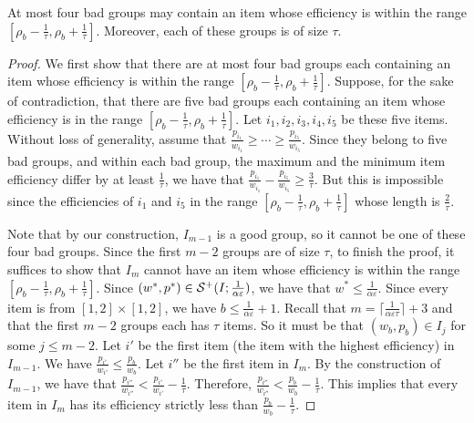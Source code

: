 \documentclass[a4paper,UKenglish,cleveref, autoref, thm-restate, pdfa]{lipics-v2021}
\newcommand{\eps}{\varepsilon}
\renewcommand{\leq}{\leqslant}
\renewcommand{\geq}{\geqslant}
\begin{document}
\begin{lemma}\label{lem:bound-median}
    At most four bad groups may contain an item whose efficiency is within the range $[\rho_b - \frac{1}{\tau}, \rho_b + \frac{1}{\tau}]$. Moreover, each of these groups is of size $\tau$.
\end{lemma}
\begin{proof}
    We first show that there are at most four bad groups each containing an item whose efficiency is within the range $[\rho_b - \frac{1}{\tau}, \rho_b + \frac{1}{\tau}]$.  Suppose, for the sake of contradiction, that there are five bad groups each containing an item whose efficiency is in the range $[\rho_b - \frac{1}{\tau}, \rho_b + \frac{1}{\tau}]$.  Let $i_1, i_2, i_3, i_4, i_5$ be these five items. Without loss of generality, assume that $\frac{p_{i_1}}{w_{i_1}} \geq \cdots \geq \frac{p_{i_5}}{w_{i_5}}$. Since they belong to five bad groups, and within each bad group, the maximum and the minimum item efficiency differ by at least $\frac{1}{\tau}$, we have that $\frac{p_{i_1}}{w_{i_1}} - \frac{p_{i_5}}{w_{i_5}} \geq \frac{3}{\tau}$. But this is impossible since the efficiencies of $i_1$ and $i_5$ in the range $[\rho_b - \frac{1}{\tau}, \rho_b + \frac{1}{\tau}]$ whose length is $\frac{2}{\tau}$.

    Note that by our construction, $I_{m-1}$ is a good group, so it cannot be one of these four bad groups. 
    Since the first $m-2$ groups are of size $\tau$, to finish the proof, it suffices to show that $I_{m}$ cannot have an item whose efficiency is within the range $[\rho_b - \frac{1}{\tau}, \rho_b + \frac{1}{\tau}]$.  Since $(w^*, p^*) \in {\cal S}^+(I; \frac{1}{\alpha\eps})$, we have that $w^* \leq \frac{1}{\alpha\eps}$. Since every item is from $[1,2]\times[1,2]$, we have $b \leq \frac{1}{\alpha\eps} + 1$. Recall that $m = \lceil\frac{1}{\alpha\eps\tau}\rceil + 3$ and that the first $m-2$ groups each has $\tau$ items. So it must be that $(w_b, p_b) \in I_j$ for some $j \leq m-2$. Let $i'$ be the first item (the item with the highest efficiency) in $I_{m-1}$. We have $ \frac{p_{i'}}{w_{i'}} \leq \frac{p_b}{w_b}$. Let $i''$ be the first item in $I_m$.  By the construction of $I_{m-1}$, we have that 
    \(
        \frac{p_{i''}}{w_{i''}} < \frac{p_{i'}}{w_{i'}} -  \frac{1}{\tau}.
    \)
    Therefore, 
    \(
        \frac{p_{i''}}{w_{i''}} < \frac{p_{b}}{w_{b}} -  \frac{1}{\tau}.
    \)
    This implies that every item in $I_m$ has its efficiency strictly less than $\frac{p_{b}}{w_{b}} -  \frac{1}{\tau}$.
\end{proof}
\end{document}

